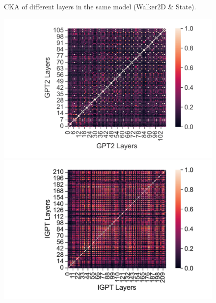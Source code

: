 \documentclass{article}
\begin{document}
\begin{figure}[H]
\begin{minipage}[b]{0.32\linewidth}
    \end{minipage}
    \caption{CKA of different layers in the same model (Walker2D \& State).}
\end{figure}

\begin{figure}[H]
    \centering
    \begin{minipage}[b]{0.32\linewidth}
        \includegraphics[width=\linewidth]{figs/cka_40_40_gpt2gpt2_walker2d_medium_666_reward.png}
    \end{minipage}
    \begin{minipage}[b]{0.32\linewidth}
        \includegraphics[width=\linewidth]{figs/cka_40_40_igptigpt_walker2d_medium_666_reward.png}
    \end{minipage}
    \begin{minipage}[b]{0.32\linewidth}

\end{minipage}
\end{figure}
\end{document}
